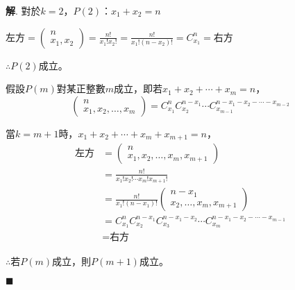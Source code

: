 \documentclass[12pt]{article}
\newenvironment*{sol}{\par \textbf{解}.}{\hfill$\blacksquare$}
\begin{document}
\begin{enumerate}
\begin{enumerate}
\begin{sol}
                對於$k=2$，$P(2)$：$x_1+x_2=n$

                左方$=\begin{pmatrix}
                    n\\x_1,x_2
                \end{pmatrix}=\frac{n!}{x_1!x_2!}=\frac{n!}{x_1!(n-x_2)!}=C_{x_1}^n=$右方

                $\therefore P(2)$成立。

                假設$P(m)$對某正整數$m$成立，即若$x_1+x_2+\cdots+x_m=n$，$$\begin{pmatrix}
                    n\\x_1,x_2,\dots,x_m
                \end{pmatrix}=C_{x_1}^n C_{x_2}^{n-x_1}\cdots C_{x_{m-1}}^{n-x_1-x_2-\cdots-x_{m-2}}$$

                當$k=m+1$時，$x_1+x_2+\cdots+x_m+x_{m+1}=n$，\begin{align*}
                    \textrm{左方}&=\begin{pmatrix}
                        n\\x_1,x_2,\dots,x_m,x_{m+1}
                    \end{pmatrix}\\&=\frac{n!}{x_1!x_2!\cdots x_m!x_{m+1}!}\\
                    &=\frac{n!}{x_1!(n-x_1)!}\begin{pmatrix}
                        n-x_1\\x_2,\dots,x_m,x_{m+1}
                    \end{pmatrix}\\
                    &=C_{x_1}^n C_{x_2}^{n-x_1} C_{x_3}^{n-x_1-x_2}\cdots C_{x_m}^{n-x_1-x_2-\cdots-x_{m-1}}\\
                    &=\textrm{右方}
                \end{align*}

                $\therefore$若$P(m)$成立，則$P(m+1)$成立。


\end{sol}
\end{enumerate}
\end{enumerate}
\end{document}
